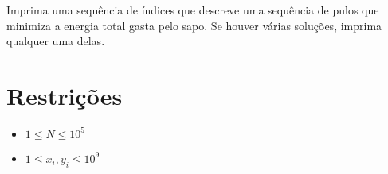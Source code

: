Imprima uma sequência de índices que descreve uma sequência de pulos que minimiza a energia total gasta pelo sapo. Se houver várias soluções, imprima qualquer uma delas.

\section*{Restrições}

\begin{itemize}
\item $ 1 \leq N \leq 10^5$
\item $1 \leq x_i, y_i \leq 10^9$
\end{itemize}


\exemplo
